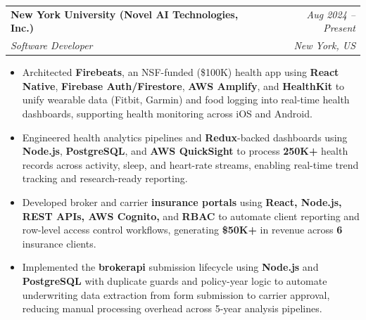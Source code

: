 \documentclass[letterpaper,10pt]{article}
\makeatletter
\newcommand{\resumeSubheading}[4]{
  \vspace{3pt}
  \begin{tabular*}{\textwidth}{@{}l@{\extracolsep{\fill}}r@{}}
    \textbf{#1} & \textit{#4} \\
    \textit{#3} & \textit{#2} \\
  \end{tabular*}\vspace{0pt}
}
\newcommand{\resumeItemListStart}{\begin{itemize}[leftmargin=12pt, itemsep=0.9pt, topsep=1.5pt, parsep=0pt]}
\newcommand{\resumeItemListEnd}{\end{itemize}\vspace{-1pt}}
\makeatother
\begin{document}
\resumeSubheading
{New York University (Novel AI Technologies, Inc.)}{New York, US}
{Software Developer}{Aug 2024 -- Present}
\resumeItemListStart
  \item \footnotesize{Architected \textbf{Firebeats}, an NSF-funded (\$100K) health app using \textbf{React Native}, \textbf{Firebase Auth/Firestore}, \textbf{AWS Amplify}, and \textbf{HealthKit} to unify wearable data (Fitbit, Garmin) and food logging into real-time health dashboards, supporting health monitoring across iOS and Android.}
  \item \footnotesize{Engineered health analytics pipelines and \textbf{Redux}-backed dashboards using \textbf{Node.js}, \textbf{PostgreSQL}, and \textbf{AWS QuickSight} to process \textbf{250K+} health records across activity, sleep, and heart-rate streams, enabling real-time trend tracking and research-ready reporting.}
  \item \footnotesize{Developed broker and carrier \textbf{insurance portals} using \textbf{React, Node.js, REST APIs, AWS Cognito,} and \textbf{RBAC} to automate client reporting and row-level access control workflows, generating \textbf{\$50K+} in revenue across \textbf{6} insurance clients.}
  \item \footnotesize{Implemented the \textbf{brokerapi} submission lifecycle using \textbf{Node.js} and \textbf{PostgreSQL} with duplicate guards and policy-year logic to automate underwriting data extraction from form submission to carrier approval, reducing manual processing overhead across 5-year analysis pipelines.}
\resumeItemListEnd
\vspace{2pt}
\end{document}
